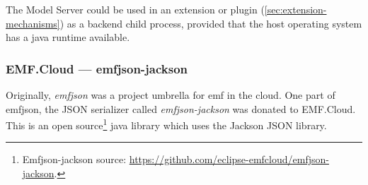 The Model Server could be used in an extension or plugin (\cref{sec:extension-mechanisms}) as a backend child process, provided that the host operating system has a java runtime available.


\subsubsection{EMF.Cloud --- emfjson-jackson}
Originally, \emph{emfjson} was a project umbrella for \gls{emf} in the \gls{cloud}.
One part of emfjson, the \gls{JSON} serializer called \emph{emfjson-jackson} was donated to EMF.Cloud.
This is an \gls{open source}\footnote{Emfjson-jackson source: \href{https://github.com/eclipse-emfcloud/emfjson-jackson}{https://github.com/eclipse-emfcloud/emfjson-jackson}.} java library which uses the Jackson JSON library.\cite{guillaumehillairetEclipseemfcloudEmfjsonjackson2020}


